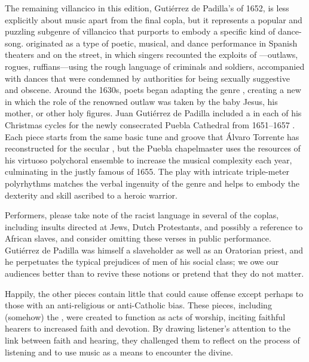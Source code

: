 The remaining villancico in this edition, Gutiérrez de Padilla's 
of 1652, is less explicitly about music apart from the final copla, but it
represents a popular and puzzling subgenre of villancico that purports to
embody a specific kind of dance-song.
 originated as a type of poetic, musical, and dance performance
in Spanish theaters and on the street, in which singers recounted the exploits
of ---outlaws, rogues, ruffians---using the rough language of
criminals and soldiers, accompanied with dances that were condemned by
authorities for being sexually suggestive and obscene.%
    \citXXX[Torrente]
Around the 1630s, poets began adapting the genre , creating
a new  in which the role of the renowned outlaw
was taken by the baby Jesus, his mother, or other holy figures.
Juan Gutiérrez de Padilla included a  in each of his Christmas
cycles for the newly consecrated Puebla Cathedral from 1651--1657
\XXX[check].%
    \citXXX[recording]
Each piece starts from the same basic tune and groove that Álvaro Torrente has
reconstructed for the secular , but the Puebla chapelmaster uses
the resources of his virtuoso polychoral ensemble to increase the musical
complexity each year, culminating in the justly famous  of 1655.
The play with intricate triple-meter polyrhythms matches the verbal ingenuity
of the genre and helps to embody the dexterity and skill ascribed to a 
heroic warrior.

Performers, please take note of the racist language in several of the
coplas, including insults directed at Jews, Dutch Protestants, and possibly a
reference to African slaves, and consider omitting these verses in public
performance.
Gutiérrez de Padilla was himself a slaveholder as well as an Oratorian priest,
and he perpetuates the typical prejudices of men of his social class; we owe
our audiences better than to revive these notions or pretend that they do not
matter.%
    \citXXX[sources]

Happily, the other pieces contain little that could cause offense except
perhaps to those with an anti-religious or anti-Catholic bias. 
These pieces, including (somehow) the , were created to function
as acts of worship, inciting faithful hearers to increased faith and devotion.
By drawing listener's attention to the link between faith and hearing, they
challenged them to reflect on the process of listening and to use music as a
means to encounter the divine.

